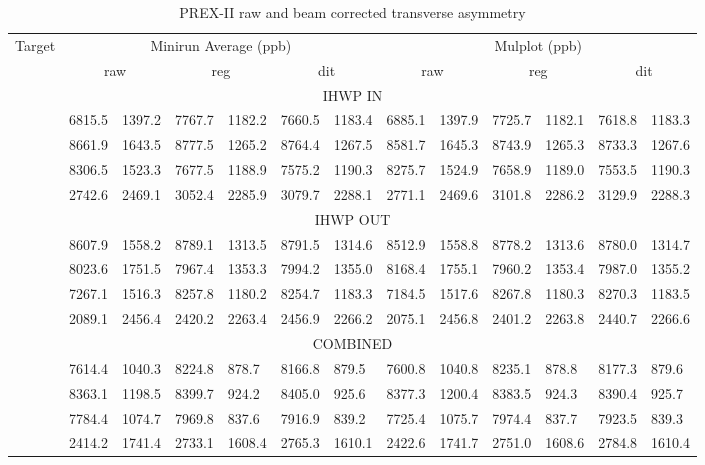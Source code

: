 \begin{table}[!h]
    \scriptsize
    \begin{tabular}{c | r@{ $\pm$ }l r@{ $\pm$ }l r@{ $\pm$ }l | r@{ $\pm$ }l r@{ $\pm$ }l r@{ $\pm$ }l}
	\hline
	\multirow{2}{*}{Target}	& \multicolumn{6}{c|}{Minirun Average (ppb)} & \multicolumn{6}{c}{Mulplot (ppb)}	\\
	\cline{2-13}
	    & \multicolumn{2}{c}{raw}   & \multicolumn{2}{c}{reg}	& \multicolumn{2}{c|}{dit}   & \multicolumn{2}{c}{raw}	& \multicolumn{2}{c}{reg}   & \multicolumn{2}{c}{dit}	\\
	\hline
	\multicolumn{13}{c}{IHWP IN}   \\
	\hline
	\C	& 6815.5    & 1397.2	& 7767.7    & 1182.2	& 7660.5    & 1183.4	& 6885.1    & 1397.9	& 7725.7    & 1182.1	& 7618.8 & 1183.3	\\ 
	\ca     & 8661.9    & 1643.5	& 8777.5    & 1265.2	& 8764.4    & 1267.5	& 8581.7    & 1645.3	& 8743.9    & 1265.3	& 8733.3 & 1267.6	\\ 
	\Ca     & 8306.5    & 1523.3   	& 7677.5    & 1188.9	& 7575.2    & 1190.3	& 8275.7    & 1524.9	& 7658.9    & 1189.0	& 7553.5 & 1190.3	\\ 
	\Pb	& 2742.6    & 2469.1   	& 3052.4    & 2285.9	& 3079.7    & 2288.1	& 2771.1    & 2469.6	& 3101.8    & 2286.2	& 3129.9 & 2288.3	\\ 
	\hline
	\multicolumn{13}{c}{IHWP OUT}   \\
	\hline
	\C	& 8607.9	& 1558.2    & 8789.1	& 1313.5    & 8791.5	& 1314.6    & 8512.9    & 1558.8	& 8778.2    & 1313.6	& 8780.0    & 1314.7	\\      
	\ca      & 8023.6	& 1751.5    & 7967.4	& 1353.3    & 7994.2	& 1355.0    & 8168.4    & 1755.1	& 7960.2    & 1353.4	& 7987.0    & 1355.2	\\      
	\Ca      & 7267.1	& 1516.3    & 8257.8	& 1180.2    & 8254.7	& 1183.3    & 7184.5    & 1517.6	& 8267.8    & 1180.3	& 8270.3    & 1183.5	\\      
	\Pb	& 2089.1	& 2456.4    & 2420.2	& 2263.4    & 2456.9	& 2266.2    & 2075.1    & 2456.8	& 2401.2    & 2263.8	& 2440.7    & 2266.6	\\      
	\hline
	\multicolumn{13}{c}{COMBINED}   \\
	\hline
	\C	& 7614.4	& 1040.3    & 8224.8	& 878.7     & 8166.8	& 879.5	    & 7600.8    & 1040.8	& 8235.1    & 878.8 	& 8177.3    & 879.6	\\      
	\Ca      & 8363.1	& 1198.5    & 8399.7	& 924.2     & 8405.0	& 925.6	    & 8377.3    & 1200.4	& 8383.5    & 924.3 	& 8390.4    & 925.7 	\\        
	\Ca  	& 7784.4	& 1074.7    & 7969.8	& 837.6     & 7916.9	& 839.2	    & 7725.4    & 1075.7	& 7974.4    & 837.7 	& 7923.5    & 839.3 	\\        
	\Pb      & 2414.2	& 1741.4    & 2733.1	& 1608.4    & 2765.3	& 1610.1    & 2422.6    & 1741.7	& 2751.0    & 1608.6	& 2784.8    & 1610.4	\\        
	\hline
    \end{tabular}
    \caption{PREX-II raw and beam corrected transverse asymmetry}
\end{table}

